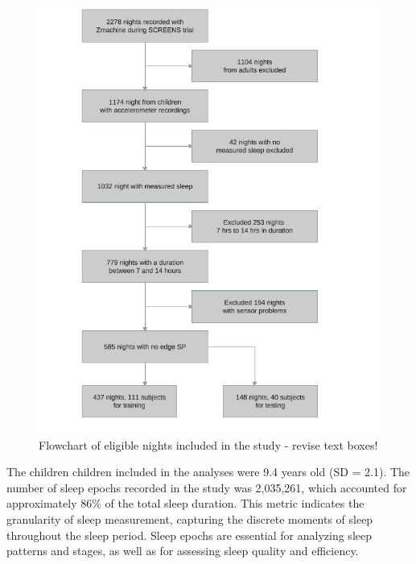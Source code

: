 \documentclass[
  super,
  preprint,
  3p]{elsarticle}
\begin{document}
\begin{figure}[b]

{\centering \includegraphics{visuals/flowchart_of_elligible_nights.pdf}

}

\caption{Flowchart of eligible nights included in the study - revise
text boxes!}

\end{figure}

The children children included in the analyses were 9.4 years old (SD =
2.1). The number of sleep epochs recorded in the study was 2,035,261,
which accounted for approximately 86\% of the total sleep duration. This
metric indicates the granularity of sleep measurement, capturing the
discrete moments of sleep throughout the sleep period. Sleep epochs are
essential for analyzing sleep patterns and stages, as well as for
assessing sleep quality and efficiency.
\end{document}
